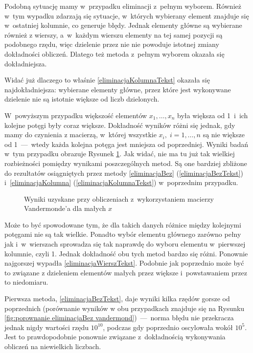 \documentclass[a4paper]{article}
\begin{document}
Podobną sytuację mamy w~przypadku eliminacji z~pełnym wyborem. Również w~tym wypadku zdarzają się sytuacje, w~których wybierany element znajduje się w~ostatniej kolumnie, co generuje błędy.
Jednak elementy główne są wybierane również z wierszy, a~w~każdym wierszu elementy na tej samej pozycji są podobnego rzędu, więc dzielenie przez nie nie powoduje istotnej zmiany dokładności obliczeń.
Dlatego też metoda z~pełnym wyborem okazała się dokładniejsza.

Widać już dlaczego to właśnie \ref{eliminacjaKolumnaTekst} okazała się najdokładniejsza: wybierane elementy główne, przez które jest wykonywane dzielenie nie są istotnie większe od liczb dzielonych.

W~powyższym przypadku większość elementów $x_1, \dots, x_n$ była większa od 1~i~ich kolejne potęgi były coraz większe. Dokładność wyników różni się jednak, gdy mamy do czynienia z macierzą, w~której
wszystkie $x_i,\;i=1,\dots,n$ są nie większe od 1~---~wtedy każda kolejna potęga jest mniejsza od poprzedniej. Wyniki badań w~tym przypadku obrazuje Rysunek \ref{fig:vandermond maly}. Jak widać, nie
ma tu już tak wielkiej rozbieżności pomiędzy wynikami poszczególnych metod.
Są one bardziej zbliżone do rezultatów osiągniętych przez metody \ref{eliminacjaBez} (\ref{eliminacjaBezTekst}) i~\ref{eliminacjaKolumna} (\ref{eliminacjaKolumnaTekst}) w~poprzednim przypadku. 

\begin{figure}[H]
 \centering
\caption{Wyniki uzyskane przy obliczeniach z~wykorzystaniem macierzy Vandermonde'a dla małych $x$}
\label{fig:vandermond maly}
\end{figure}

Może to być spowodowane tym, że dla takich danych różnice między kolejnymi potęgami nie są tak wielkie. Ponadto wybór elementu głównego zarówno pełny jak i~w~wierszach sprowadza się tak naprawdę do wyboru elementu
w~pierwszej kolumnie, czyli 1. Jednak dokładność obu tych metod bardzo się różni. Ponownie najgorszej wypadła \ref{eliminacjaWierszTekst}. Podobnie jak poprzednio może być to związane z dzieleniem elementów małych przez
większe i~powstawaniem przez to niedomiaru.

Pierwsza metoda, \ref{eliminacjaBezTekst}, daje wyniki kilka rzędów gorsze od poprzednich (porównanie wyników w obu przypadkach znajduje się na Rysunku \ref{fig:porownanie eliminacjaBez vandermond})~---~norma błędu nie 
przekracza jednak nigdy wartości rzędu $10^{10}$, podczas gdy poprzednio oscylowała wokół $10^5$. Jest to prawdopodobnie ponownie związane z~dokładnością wykonywania obliczeń na niewielkich liczbach.
\end{document}
